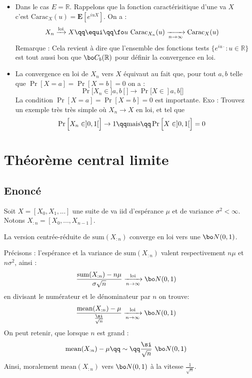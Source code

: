 \documentclass{article}
\begin{document}
\begin{itemize}
\item Dans le cas $E=\mathbb R$.  Rappelons que la fonction caractérisitique d'une va $X$ c'est $\text{Carac}_X(u)=\mathbf E[e^{iuX}]$.   On a :
$$
X_n   \xrightarrow{\text{loi}}   X   \qq \equi \qq      \fo u \   \text{Carac}_{X_n} (u)  \xrightarrow[n\to \infty]{}   \text{Carac}_X(u)
$$
Remarque : Cela revient à dire que l'ensemble des fonctions tests  $\{e^{iu\cdot} : u\in \mathbb R \}$  est tout aussi bon que  $\bo C_b(\mathbb R)$ pour définir la convergence en loi.

\item  La convergence en loi de $X_n$ vers $X$ équivaut au fait que, pour tout $a,b$ telle que $ \Pr[X=a]=\Pr[X=b]=0$ on a : 
$$
\Pr\Big[X_n\in ]a,b[  \Big] \to \Pr\Big[X\in ]a,b[  \Big]
$$
La condition $ \Pr[X=a]=\Pr[X=b]=0$ est importante. Exo :  Trouvez un exemple très très simple où $X_n\to X$ en loi, et tel que 
$$
\Pr\Big[X_n\in ]0,1[  \Big] \to  1  \qq \mathrm{ mais } \qq \Pr\Big[X\in ]0,1[  \Big] = 0
$$
\end{itemize}











\section{Théorème central limite}



\subsection{Enoncé}


Soit $X=[X_0,X_1,...]$ une suite de va iid d'espérance $\mu$ et de variance $\sigma^2<\infty$. Notons  $X_{:n}=[X_0,...,X_{n-1}]$.   

\begin{theorem}
La version centrée-réduite de $\mathrm{sum} (X_{:n})$ converge en loi vers une $\bo N(0,1)$. 
\end{theorem}

Précisons : l'espérance et la variance de $\mathrm{sum} (X_{:n})$ valent respectivement $n\mu$ et $n \sigma^2$, ainsi :
$$
\frac {\mathrm{sum}(X_{:n}) - n \mu}{\sigma \sqrt{n} }   \xrightarrow[n\to \infty]{\text{loi}} \bo N(0,1)
$$
en divisant le numérateur et le dénominateur par $n$ on trouve:
$$
\frac {\mathrm{mean}(X_{:n}) - \mu}{  \frac {\si} {\sqrt{n}} }   \xrightarrow[n\to \infty]{\text{loi}}  \bo N(0,1)
$$
On peut retenir, que lorsque $n$ est grand :
$$
\text{mean}(X_{:n})  -  \mu    \qq   \sim  \qq    \frac {\si}{\sqrt{n}} \   \bo N(0,1)
$$ 
Ainsi, moralement  $\text{mean}(X_{:n})$  vers $\bo N(0,1)$ à la vitesse $ \frac {1}{\sqrt{n}}$. 
\end{document}
